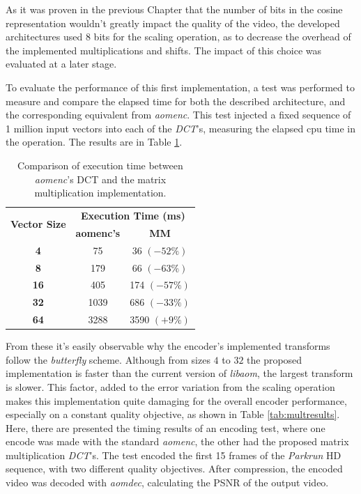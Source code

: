 As it was proven in the previous Chapter that the number of bits in the cosine representation wouldn't greatly impact the quality of the video, the developed architectures used 8 bits for the scaling operation, as to decrease the overhead of the implemented multiplications and shifts. The impact of this choice was evaluated at a later stage.

To evaluate the performance of this first implementation, a test was performed to measure and compare the elapsed time for both the described architecture, and the corresponding equivalent from \emph{aomenc}. This test injected a fixed sequence of 1 million input vectors into each of the \emph{DCT}'s,  measuring the elapsed cpu time in the operation. The results are in Table \ref{tab:dcttime}.

\begin{table}[!htpb]
    \centering
    \begin{tabular}{ccc} \toprule
        \multirow{2}{*}{\textbf{Vector Size}} &     \multicolumn{2}{c}{\textbf{Execution Time (ms)}} \\
         &      \textbf{aomenc's} &      \textbf{MM} \\ \toprule
        \textbf{4} &    75 &       36 $(-52\%)$ \\ \hline
        \textbf{8} &    179 &      66 $(-63\%)$ \\ \hline
        \textbf{16} &   405 &      174 $(-57\%)$ \\ \hline
        \textbf{32} &   1039 &     686 $(-33\%)$  \\ \hline
        \textbf{64} &   3288 &     3590 $(+9\%)$  \\ 
        \bottomrule
    \end{tabular}
    \caption{Comparison of execution time between \emph{aomenc}'s DCT and the matrix multiplication implementation.}
    \label{tab:dcttime}
\end{table}

From these it's easily observable why the encoder's implemented transforms follow the \emph{butterfly} scheme. Although from sizes $4$ to $32$ the proposed implementation is faster than the current version of \emph{libaom}, the largest transform is slower. This factor, added to the error variation from the scaling operation makes this implementation quite damaging for the overall encoder performance, especially on a constant quality objective, as shown in Table \ref{tab:multresults}. Here, there are presented the timing results of an encoding test, where one encode was made with the standard \emph{aomenc}, the other had the proposed matrix multiplication \emph{DCT}'s. The test encoded the first 15 frames of the \emph{Parkrun} HD sequence, with two different quality objectives. After compression, the encoded video was decoded with \emph{aomdec}, calculating the PSNR of the output video.

